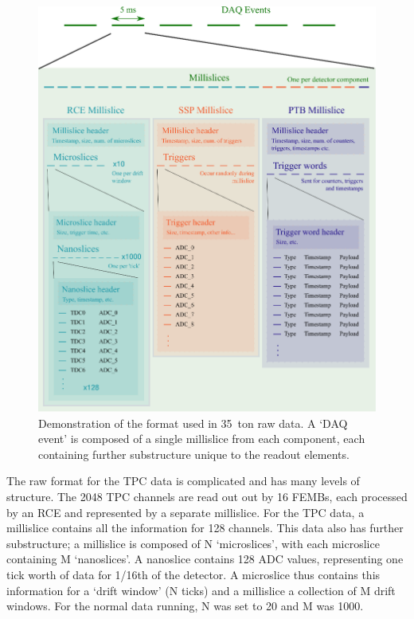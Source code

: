 \begin{figure}
  \centering
  \includegraphics[width=14cm]{data_format.eps}
  \caption[Demonstration of the format used in 35~ton raw data.]{Demonstration of the format used in 35~ton raw data.  A `DAQ event' is composed of a single millislice from each component, each containing further substructure unique to the readout elements.}
  \label{fig:35tonDataFormat}
\end{figure}

The raw format for the TPC data is complicated and has many levels of structure.  The 2048 TPC channels are read out out by 16 FEMBs, each processed by an RCE and represented by a separate millislice.  For the TPC data, a millislice contains all the information for 128 channels.  This data also has further substructure; a millislice is composed of N `microslices', with each microslice containing M `nanoslices'.  A nanoslice contains 128 ADC values, representing one tick worth of data for 1/16th of the detector.  A microslice thus contains this information for a `drift window' (N ticks) and a millislice a collection of M drift windows.  For the normal data running, N was set to 20 and M was 1000.

